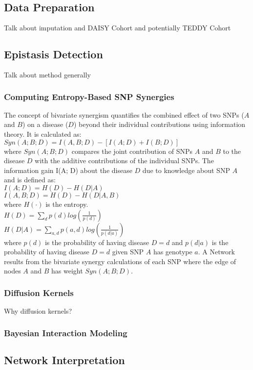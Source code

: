\documentclass{article}\usepackage[]{graphicx}\usepackage[]{color}
\begin{document}
\subsection{Data Preparation}
Talk about imputation and DAISY Cohort and potentially TEDDY Cohort
\subsection{Epistasis Detection}
Talk about method generally
\subsubsection{Computing Entropy-Based SNP Synergies}
The concept of bivariate synergism quantifies the combined effect of two SNPs ($A$ and $B$) on a disease ($D$) beyond their individual contributions using information theory. It is calculated as:\\
$Syn(A; B; D) = I(A, B; D) -[I(A; D) + I(B; D)]$\\
where $Syn(A; B; D)$ compares the joint contribution of SNPs $A$ and $B$ to the disease $D$ with the additive contributions of the individual SNPs. The information gain I(A; D) about the disease $D$ due to knowledge about SNP $A$ and is defined as:\\
$I(A; D) = H(D) - H(D|A) $\\
$I(A, B; D) = H(D) - H(D|A, B)$ \\ where $H(\cdot)$ is the entropy. \\
$H(D) = \sum_d p(d)log(\frac{1}{p(d)})$\\
$H(D|A) = \sum_{a,d} p(a,d)log(\frac{1}{p(d|a)})$\\ where $p(d)$ is the probability of having disease $D=d$ and $p(d|a)$ is the probability of having disease $D=d$ given SNP $A$ has genotype $a$.
A Network results from the bivariate synergy calculations of each SNP where the edge of nodes $A$ and $B$ has weight $Syn(A; B; D)$.
\subsubsection{Diffusion Kernels}
Why diffusion kernels?
\subsubsection{Bayesian Interaction Modeling}
\subsection{Network Interpretation}
\end{document}
